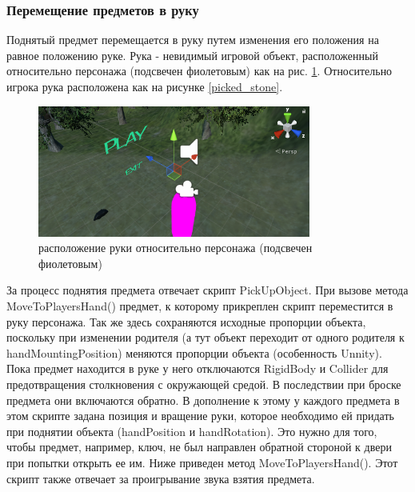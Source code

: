 \subsubsection{Перемещение предметов в руку}

\tab[0.75cm]Поднятый предмет перемещается в руку путем изменения его положения на равное положению руке. Рука - невидимый игровой объект, расположенный относительно персонажа (подсвечен фиолетовым) как на рис. \ref{hand}. Относительно игрока рука расположена как на рисунке \ref{picked_stone}.

\begin{figure}[h!]
	\centering
	\includegraphics[width=0.8\textwidth]{./screenshots/hand.png}
	\caption{\small{расположение руки относительно персонажа (подсвечен фиолетовым)}}
	\label{hand}
\end{figure} 

За процесс поднятия предмета отвечает скрипт PickUpObject. При вызове метода MoveToPlayersHand() предмет, к которому прикреплен скрипт переместится в руку персонажа. Так же здесь сохраняются исходные пропорции объекта, поскольку при изменении родителя (а тут объект переходит от одного родителя к handMountingPosition) меняются пропорции объекта (особенность Unnity). Пока предмет находится в руке у него отключаются RigidBody и Collider для предотвращения столкновения с окружающей средой. В последствии при броске предмета они включаются обратно. В дополнение к этому у каждого предмета в этом скрипте задана позиция и вращение руки, которое необходимо ей придать при поднятии объекта (handPosition и handRotation). Это нужно для того, чтобы предмет, например, ключ, не был направлен обратной стороной к двери при попытки открыть ее им. Ниже приведен метод MoveToPlayersHand(). Этот скрипт также отвечает за проигрывание звука взятия предмета.

